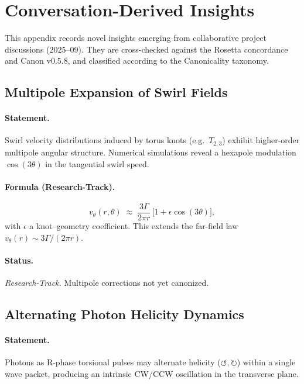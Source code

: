 \documentclass[10pt,reprint,aps,onecolumn,nofootinbib]{revtex4-2}
\begin{document}
    \section{Conversation-Derived Insights}
    \label{app:conv_insights}

    This appendix records novel insights emerging from collaborative project discussions
    (2025–09). They are cross-checked against the Rosetta concordance and Canon v0.5.8,
    and classified according to the Canonicality taxonomy.

    \subsection{Multipole Expansion of Swirl Fields}
        \paragraph{Statement.}
            Swirl velocity distributions induced by torus knots (e.g.\ $T_{2,3}$) exhibit higher-order
            multipole angular structure. Numerical simulations reveal a hexapole modulation
            $\cos(3\theta)$ in the tangential swirl speed.

        \paragraph{Formula (Research-Track).}
            \[
                v_\theta(r,\theta) \;\approx\; \frac{3\Gamma}{2\pi r}\,\Big[1 + \epsilon \cos(3\theta)\Big],
            \]
            with $\epsilon$ a knot–geometry coefficient. This extends the far-field law
            $v_\theta(r)\sim 3\Gamma/(2\pi r)$.

        \paragraph{Status.} \emph{Research-Track.} Multipole corrections not yet canonized.

    \subsection{Alternating Photon Helicity Dynamics}
    \paragraph{Statement.}
        Photons as R-phase torsional pulses may alternate helicity ($\circlearrowleft,\circlearrowright$) within
        a single wave packet, producing an intrinsic CW/CCW oscillation in the transverse plane.
\end{document}
